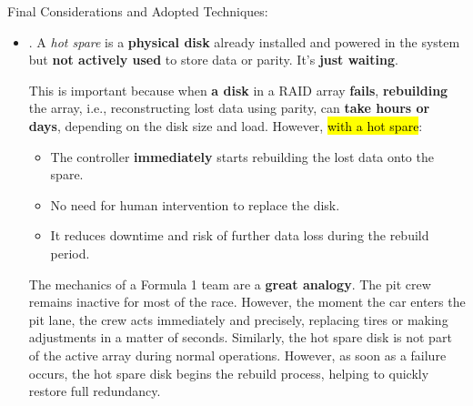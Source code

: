 \noindent
Final Considerations and Adopted Techniques:
\begin{itemize}
    \item {}. A \emph{hot spare} is a \textbf{physical disk} already installed and powered in the system but \textbf{not actively used} to store data or parity. It's \textbf{just waiting}.
    
    This is important because when \textbf{a disk} in a RAID array \textbf{fails}, \textbf{rebuilding} the array, i.e., reconstructing lost data using parity, can \textbf{take hours or days}, depending on the disk size and load. However, \hl{with a hot spare}:
    \begin{itemize}[label=\textcolor{Green3}{}]
        \item The controller \textbf{immediately} starts rebuilding the lost data onto the spare.
        \item No need for human intervention to replace the disk.
        \item It reduces downtime and risk of further data loss during the rebuild period.
    \end{itemize}
    The mechanics of a Formula 1 team are a \textbf{great analogy}. The pit crew remains inactive for most of the race. However, the moment the car enters the pit lane, the crew acts immediately and precisely, replacing tires or making adjustments in a matter of seconds. Similarly, the hot spare disk is not part of the active array during normal operations. However, as soon as a failure occurs, the hot spare disk begins the rebuild process, helping to quickly restore full redundancy. 


\end{itemize}
